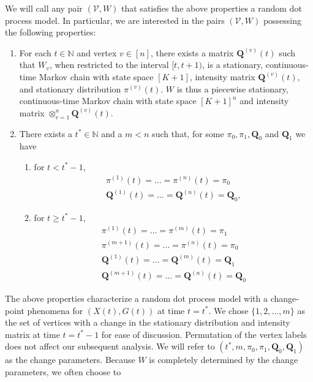 \documentclass[10pt,journal,compsoc]{IEEEtran}
\theoremstyle{definition}
\begin{document}
We will call any pair $(\mathscr{V}, W)$ that satisfies the above
properties a random dot process model. In particular, we are
interested in the pairs $(\mathscr{V}, W)$ possessing the following
properties:
\begin{enumerate}
\item For each $t \in \mathbb{N}$ and vertex $v \in [n]$, there exists
  a matrix $\mathbf{Q}^{(v)}(t)$ such that $W_v$, when restricted to
  the interval $[t, t+1)$, is a stationary, continuous-time Markov
  chain with state space $[K+1]$, intensity matrix
  ${\mathbf{Q}^{(v)}(t)}$, and stationary distribution
  $\pi^{(v)}(t)$. $W$ is thus a piecewise stationary, continuous-time
  Markov chain with state space $[K+1]^{n}$ and intensity matrix
  $\otimes_{v=1}^{n}\mathbf{Q}^{(v)}(t)$.
\item There exists a $t^{*} \in \mathbb{N}$ and a $m < n$ such that,
  for some $\pi_0, \pi_1, \mathbf{Q}_0$ and $\mathbf{Q}_1$ we have
  \begin{enumerate}
  \item for $t < t^{*} - 1$,
    \begin{gather*}
      \pi^{(1)}(t) = \dots = \pi^{(n)}(t) = \pi_0 \\
      \mathbf{Q}^{(1)}(t) = \dots = \mathbf{Q}^{(n)}(t) = \mathbf{Q}_0,
    \end{gather*}
  \item  for $t \geq t^{*} - 1$,
    \begin{gather*}
      \pi^{(1)}(t) = \dots = \pi^{(m)}(t) = \pi_1 \\
      \pi^{(m+1)}(t)  = \dots = \pi^{(n)}(t) = \pi_0 \\
      \mathbf{Q}^{(1)}(t)  = \dots = \mathbf{Q}^{(m)}(t) = \mathbf{Q}_1 \\
      \mathbf{Q}^{(m+1)}(t) = \dots = \mathbf{Q}^{(n)}(t) = \mathbf{Q}_0 
    \end{gather*}
  \end{enumerate}
\end{enumerate}
The above properties characterize a random dot process model with a
change-point phenomena for $(X(t),G(t))$ at time $t = t^{*}$. We chose $\{1,2,\dots,m\}$
as the set of vertices with a change in the stationary distribution
and intensity matrix at time $t = t^{*} - 1$ for ease of
discussion. Permutation of the vertex labels does not affect our
subsequent analysis. We will refer to $(t^{*}, m, \pi_0, \pi_1,
\mathbf{Q}_0, \mathbf{Q}_1)$ as the change parameters.  Because $W$ is
completely determined by the change parameters, we often choose to
\end{document}
